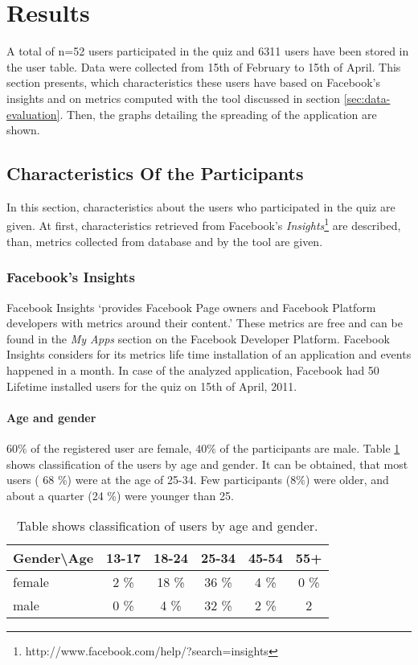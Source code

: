 \documentclass[preprint,12pt]{elsarticle}
\begin{document}
\section{Results}
\label{sec:results}
A total of n=52 users participated in the quiz and 6311 users have been
stored in the user table. Data were collected from 15th of February to
15th of April. This section presents, which
characteristics these users have based on Facebook's insights and on
metrics computed with the tool discussed in section
\ref{sec:data-evaluation}. Then, the graphs detailing the spreading of
the application are shown.

\subsection{Characteristics Of the Participants}
\label{sec:characteristics}
In this section, characteristics about the users who participated in
the quiz are given. At first, characteristics retrieved from
Facebook's
\textit{Insights}\footnote{http://www.facebook.com/help/?search=insights}
are described, than, metrics collected from database and by the tool are given.

\subsubsection{Facebook's Insights}
Facebook Insights `provides Facebook Page owners and Facebook Platform
developers with metrics around their content.'\cite{facebookInsights}
These metrics are free and can be found in the \textit{My Apps}
section on the Facebook Developer Platform.
Facebook Insights considers for its metrics life time installation of an application
and events happened in a month. In case of the analyzed application,
Facebook had 50 Lifetime installed users for the quiz on 15th of April, 2011.

\paragraph{Age and gender}
\label{sec:age-gender}
$60 \%$ of the registered user are female, $40 \%$ of the participants
are male. Table \ref{tab:agegender} shows classification of the users
by age and gender. It can be obtained, that most users ( 68 \%) were at
the age of 25-34. Few participants ($8 \%$) were older, and about a
quarter (24 \%) were younger than 25.

\begin{center}
\begin{table}
\label{tab:agegender}
\begin{tabular}{l | c c c c c}
Gender\textbackslash Age  & 13-17 & 18-24 & 25-34 & 45-54 & 55+\\
\hline
female  & 2 \% & 18 \% & 36 \% & 4 \% & 0 \%\\
male & 0 \% & 4 \% & 32 \% & 2 \%  & 2 \\
\end{tabular}
\caption{Table shows classification of users by age and gender.}
\end{table}
\end{center}
\end{document}
